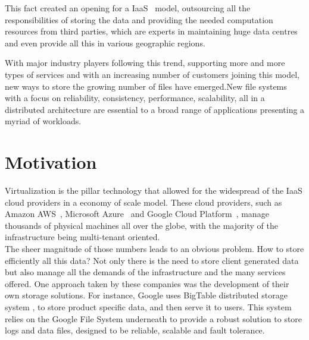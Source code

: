 This fact created an opening for a \gls{IaaS}~\cite{Mell2011} model, outsourcing all the responsibilities of storing the data and providing the needed computation resources from third parties, which are experts in maintaining huge data centres and even provide all this in various geographic regions.
%

With major industry players following this trend, supporting more and more types of services and with an increasing number of customers joining this model, new ways to store the growing number of files have emerged.New file systems with a focus on reliability, consistency, performance, scalability, all in a distributed architecture are essential to a broad range of applications presenting a myriad of workloads.



\section{Motivation} %
\label{sec:motivation}

Virtualization is the pillar technology that allowed for the widespread of the IaaS cloud providers in a economy of scale model. These cloud providers, such as Amazon AWS~\cite{aws_2017}, Microsoft Azure~\cite{azure_2017} and Google Cloud Platform~\cite{gcp_2017}, manage thousands of physical machines all over the globe, with the majority of the infrastructure being multi-tenant oriented. 
\\
%
The sheer magnitude of those numbers leads to an obvious problem. How to store efficiently all this data? 
Not only there is the need to store client generated data but also manage all the demands of the infrastructure and the many services offered. 
One approach taken by these companies was the development of their own storage solutions. For instance, Google uses BigTable distributed storage system \cite{Chang2006}, to store product specific data, and then serve it to users. This system relies on the Google File System underneath to provide a robust solution to store logs and data files, designed to be reliable, scalable and fault tolerance.
%


